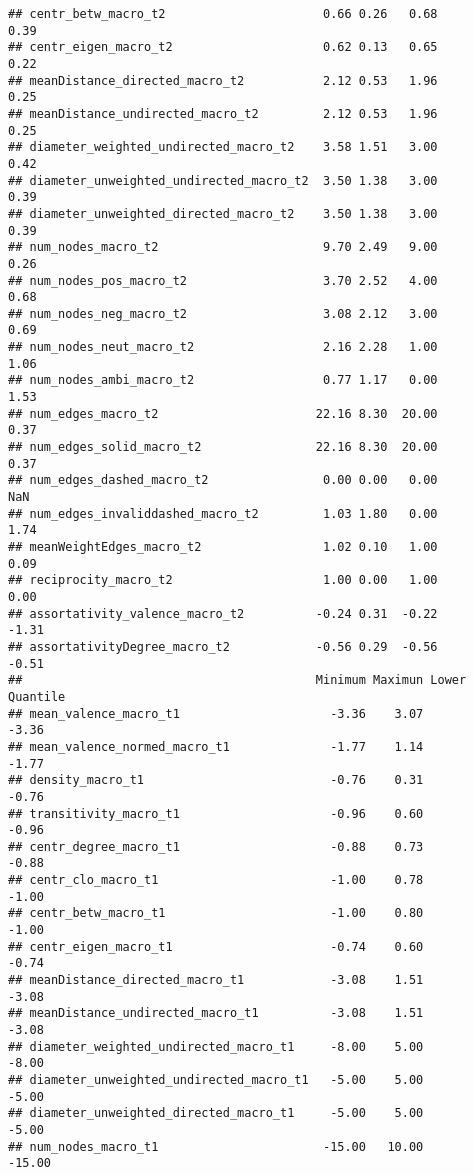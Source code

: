 \documentclass[
]{article}
\begin{document}
\begin{verbatim}
## centr_betw_macro_t2                      0.66 0.26   0.68             0.39
## centr_eigen_macro_t2                     0.62 0.13   0.65             0.22
## meanDistance_directed_macro_t2           2.12 0.53   1.96             0.25
## meanDistance_undirected_macro_t2         2.12 0.53   1.96             0.25
## diameter_weighted_undirected_macro_t2    3.58 1.51   3.00             0.42
## diameter_unweighted_undirected_macro_t2  3.50 1.38   3.00             0.39
## diameter_unweighted_directed_macro_t2    3.50 1.38   3.00             0.39
## num_nodes_macro_t2                       9.70 2.49   9.00             0.26
## num_nodes_pos_macro_t2                   3.70 2.52   4.00             0.68
## num_nodes_neg_macro_t2                   3.08 2.12   3.00             0.69
## num_nodes_neut_macro_t2                  2.16 2.28   1.00             1.06
## num_nodes_ambi_macro_t2                  0.77 1.17   0.00             1.53
## num_edges_macro_t2                      22.16 8.30  20.00             0.37
## num_edges_solid_macro_t2                22.16 8.30  20.00             0.37
## num_edges_dashed_macro_t2                0.00 0.00   0.00              NaN
## num_edges_invaliddashed_macro_t2         1.03 1.80   0.00             1.74
## meanWeightEdges_macro_t2                 1.02 0.10   1.00             0.09
## reciprocity_macro_t2                     1.00 0.00   1.00             0.00
## assortativity_valence_macro_t2          -0.24 0.31  -0.22            -1.31
## assortativityDegree_macro_t2            -0.56 0.29  -0.56            -0.51
##                                         Minimum Maximun Lower Quantile
## mean_valence_macro_t1                     -3.36    3.07          -3.36
## mean_valence_normed_macro_t1              -1.77    1.14          -1.77
## density_macro_t1                          -0.76    0.31          -0.76
## transitivity_macro_t1                     -0.96    0.60          -0.96
## centr_degree_macro_t1                     -0.88    0.73          -0.88
## centr_clo_macro_t1                        -1.00    0.78          -1.00
## centr_betw_macro_t1                       -1.00    0.80          -1.00
## centr_eigen_macro_t1                      -0.74    0.60          -0.74
## meanDistance_directed_macro_t1            -3.08    1.51          -3.08
## meanDistance_undirected_macro_t1          -3.08    1.51          -3.08
## diameter_weighted_undirected_macro_t1     -8.00    5.00          -8.00
## diameter_unweighted_undirected_macro_t1   -5.00    5.00          -5.00
## diameter_unweighted_directed_macro_t1     -5.00    5.00          -5.00
## num_nodes_macro_t1                       -15.00   10.00         -15.00

\end{verbatim}
\end{document}
